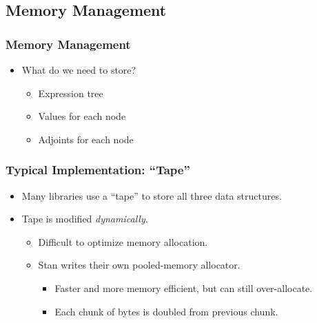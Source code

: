 \subsection{Memory Management}
\frame{\tableofcontents[currentsubsection]}

\begin{frame}
\frametitle{Memory Management}
\begin{itemize}

\item{What do we need to store?}
    \begin{itemize}
        \item Expression tree
        \item Values for each node
        \item Adjoints for each node
    \end{itemize}

\end{itemize}
\end{frame}

\begin{frame}
\frametitle{Typical Implementation: ``Tape''}

\begin{itemize}
    
\item Many libraries use a ``tape'' to store all three data structures.

\item Tape is modified \emph{dynamically}.
    \begin{itemize}
        \item Difficult to optimize memory allocation.
        \item Stan writes their own pooled-memory allocator.
            \begin{itemize}
                \item Faster and more memory efficient, but can still over-allocate.
                \item Each chunk of bytes is doubled from previous chunk.
            \end{itemize}
    \end{itemize}

\end{itemize}
\end{frame}

